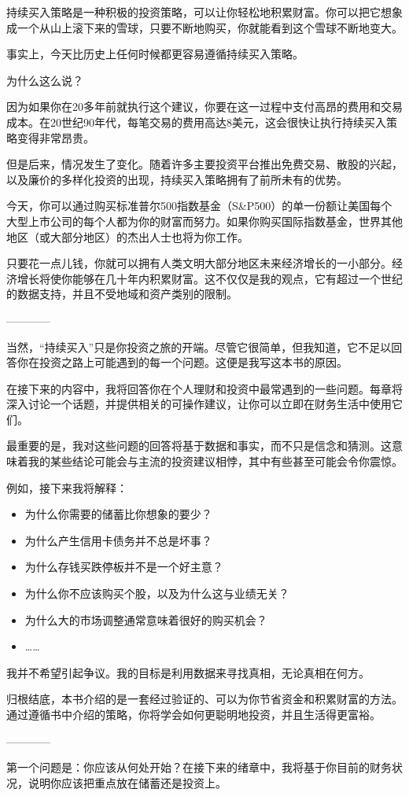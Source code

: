 持续买入策略是一种积极的投资策略，可以让你轻松地积累财富。你可以把它想象成一个从山上滚下来的雪球，只要不断地购买，你就能看到这个雪球不断地变大。

事实上，今天比历史上任何时候都更容易遵循持续买入策略。

为什么这么说？

因为如果你在20多年前就执行这个建议，你要在这一过程中支付高昂的费用和交易成本。在20世纪90年代，每笔交易的费用高达8美元，这会很快让执行持续买入策略变得非常昂贵。

但是后来，情况发生了变化。随着许多主要投资平台推出免费交易、散股的兴起，以及廉价的多样化投资的出现，持续买入策略拥有了前所未有的优势。

今天，你可以通过购买标准普尔500指数基金（S\&P500）的单一份额让美国每个大型上市公司的每个人都为你的财富而努力。如果你购买国际指数基金，世界其他地区（或大部分地区）的杰出人士也将为你工作。

只要花一点儿钱，你就可以拥有人类文明大部分地区未来经济增长的一小部分。经济增长将使你能够在几十年内积累财富。这不仅仅是我的观点，它有超过一个世纪的数据支持，并且不受地域和资产类别的限制。

\begin{center}
————
\end{center}

当然，“持续买入”只是你投资之旅的开端。尽管它很简单，但我知道，它不足以回答你在投资之路上可能遇到的每一个问题。这便是我写这本书的原因。

在接下来的内容中，我将回答你在个人理财和投资中最常遇到的一些问题。每章将深入讨论一个话题，并提供相关的可操作建议，让你可以立即在财务生活中使用它们。

最重要的是，我对这些问题的回答将基于数据和事实，而不只是信念和猜测。这意味着我的某些结论可能会与主流的投资建议相悖，其中有些甚至可能会令你震惊。

例如，接下来我将解释：

\begin{itemize}
\item 为什么你需要的储蓄比你想象的要少？
\item 为什么产生信用卡债务并不总是坏事？
\item 为什么存钱买跌停板并不是一个好主意？
\item 为什么你不应该购买个股，以及为什么这与业绩无关？
\item 为什么大的市场调整通常意味着很好的购买机会？
\item ……
\end{itemize}
我并不希望引起争议。我的目标是利用数据来寻找真相，无论真相在何方。

归根结底，本书介绍的是一套经过验证的、可以为你节省资金和积累财富的方法。通过遵循书中介绍的策略，你将学会如何更聪明地投资，并且生活得更富裕。

\begin{center}
————
\end{center}

第一个问题是：你应该从何处开始？在接下来的绪章中，我将基于你目前的财务状况，说明你应该把重点放在储蓄还是投资上。

